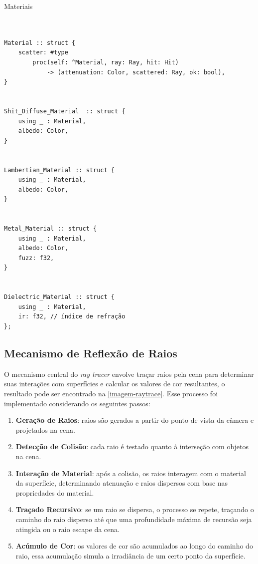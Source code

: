 \documentclass[english, 
               brazil, 
               bsc] %
               {dcomp-abntex2}
\begin{document}
\begin{codigo}
\caption{Materiais}
\label{odin-materiais}
\begin{verbatim}


Material :: struct {
    scatter: #type
        proc(self: ^Material, ray: Ray, hit: Hit)
            -> (attenuation: Color, scattered: Ray, ok: bool),
}


Shit_Diffuse_Material  :: struct {
    using _ : Material,
    albedo: Color,
}


Lambertian_Material :: struct {
    using _ : Material,
    albedo: Color,
}


Metal_Material :: struct {
    using _ : Material,
    albedo: Color,
    fuzz: f32,
}


Dielectric_Material :: struct {
    using _ : Material,
    ir: f32, // índice de refração
};
\end{verbatim}
\end{codigo}




\subsection{Mecanismo de Reflexão de Raios}


O mecanismo central do \textit{ray tracer} envolve traçar raios pela cena para determinar suas interações com superfícies e calcular os valores de cor resultantes, o resultado pode ser encontrado na \autoref{imagem-raytrace}. Esse processo foi implementado considerando os seguintes passos:


\begin{enumerate}
\item \textbf{Geração de Raios}: raios são gerados a partir do ponto de vista da câmera e projetados na cena.
\item \textbf{Detecção de Colisão}: cada raio é testado quanto à interseção com objetos na cena.
\item \textbf{Interação de Material}: após a colisão, os raios interagem com o material da superfície, determinando atenuação e raios dispersos com base nas propriedades do material.
\item \textbf{Traçado Recursivo}: se um raio se dispersa, o processo se repete, traçando o caminho do raio disperso até que uma profundidade máxima de recursão seja atingida ou o raio escape da cena.
\item \textbf{Acúmulo de Cor}: os valores de cor são acumulados ao longo do caminho do raio, essa acumulação simula a irradiância de um certo ponto da superfície.


\end{enumerate}
\end{document}
